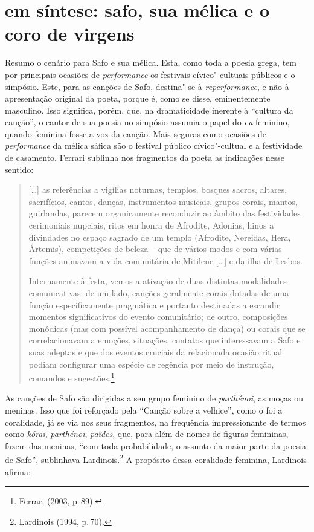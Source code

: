 \section*{em síntese: safo, sua mélica e o coro de virgens}

Resumo o cenário para Safo e sua mélica. Esta, como toda a poesia grega, tem por principais ocasiões de \textit{performance} os festivais cívico"-cultuais públicos e o simpósio. Este, para as canções de Safo, destina"-se à \textit{reperformance}, e não à apresentação original da poeta, porque é, como se disse, eminentemente masculino. Isso significa, porém, que, na dramaticidade inerente à “cultura da canção”, o cantor de sua poesia no simpósio assumia o papel do \textit{eu} feminino, quando feminina fosse a voz da canção. Mais seguras como ocasiões de \textit{performance} da mélica sáfica são o festival público cívico"-cultual e a festividade de casamento. Ferrari sublinha nos fragmentos da poeta as indicações nesse sentido: 

\begin{quote}
{[}\ldots{}{]} as referências a vigílias noturnas, templos, bosques sacros, altares, sacrifícios, cantos, danças, instrumentos musicais, grupos corais, mantos, guirlandas, parecem organicamente reconduzir ao âmbito das festividades cerimoniais nupciais, ritos em honra de Afrodite, Adonias, hinos a divindades no espaço sagrado de um templo (Afrodite, Nereidas, Hera, Ártemis), competições de beleza -- que de vários modos e com várias funções animavam a vida comunitária de Mitilene {[}\ldots{}{]} e da ilha de Lesbos.
	
Internamente à festa, vemos a ativação de duas distintas modalidades comunicativas: de um lado, canções geralmente corais dotadas de uma função especificamente pragmática e portanto destinadas a escandir momentos significativos do evento comunitário; de outro, composições monódicas (mas com possível acompanhamento de dança) ou corais que se correlacionavam a emoções, situações, contatos que interessavam a Safo e suas adeptas e que dos eventos cruciais da relacionada ocasião ritual podiam configurar uma espécie de regência por meio de instrução, comandos e sugestões.\footnote{Ferrari (2003, p.\,89).}
\end{quote}

As canções de Safo são dirigidas a seu grupo feminino de \textit{parthénoi}, as moças ou meninas. Isso que foi reforçado pela “Canção sobre a velhice”, como o foi a coralidade, já se via nos seus fragmentos, na frequência impressionante de termos como \textit{kórai}, \textit{parthénoi}, \textit{paîdes}, que, para além de nomes de figuras femininas, fazem das meninas, “com toda probabilidade, o assunto da maior parte da poesia de Safo”, sublinhava Lardinois.\footnote{Lardinois (1994, p.\,70).} A propósito dessa coralidade feminina, Lardinois afirma:

